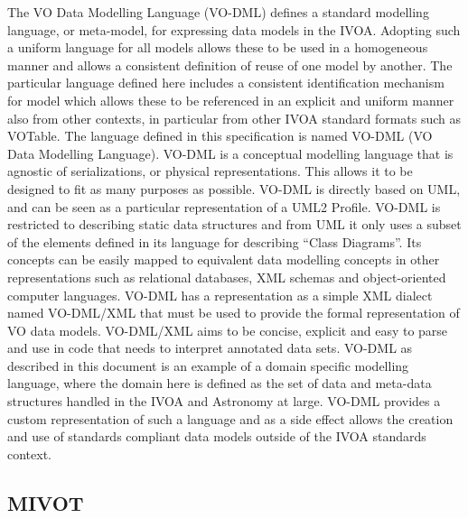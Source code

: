 \documentclass[11pt,letter]{ivoa}
\begin{document}
The VO Data Modelling Language (VO-DML) \citep{2018ivoa.spec.0910L}
defines a standard modelling language, or meta-model, for
expressing data models in the IVOA. Adopting such a uniform language for
all models allows
these to be used in a homogeneous manner and allows a consistent
definition of reuse of one
model by another. The particular language defined here includes a
consistent identification
mechanism for model which allows these to be referenced in an explicit
and uniform manner
also from other contexts, in particular from other IVOA standard formats
such as VOTable.
The language defined in this specification is named VO-DML (VO Data
Modelling Language).
VO-DML is a conceptual modelling language that is agnostic of
serializations, or physical
representations. This allows it to be designed to fit as many purposes
as possible. VO-DML
is directly based on UML, and can be seen as a particular representation
of a UML2 Profile.
VO-DML is restricted to describing static data structures and from UML
it only uses a subset
of the elements defined in its language for describing ``Class
Diagrams''. Its concepts can
be easily mapped to equivalent data modelling concepts in other
representations such as
relational databases, XML schemas and object-oriented computer
languages. VO-DML has a
representation as a simple XML dialect named VO-DML/XML that must be
used to provide the
formal representation of VO data models. VO-DML/XML aims to be concise,
explicit and
easy to parse and use in code that needs to interpret annotated data
sets. VO-DML as
described in this document is an example of a domain specific modelling
language, where the
domain here is defined as the set of data and meta-data structures
handled in the IVOA and
Astronomy at large. VO-DML provides a custom representation of such a
language and as a
side effect allows the creation and use of standards compliant data
models outside of the
IVOA standards context. 

\subsection{MIVOT} 
\end{document}
